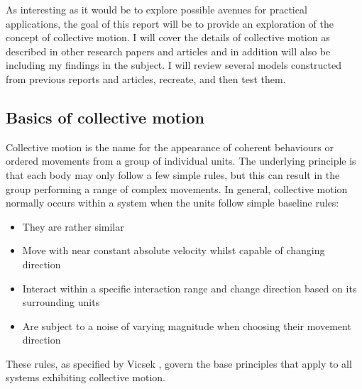 \documentclass[%
11pt,
amsmath, amssymb,
aps,
pra
]{revtex4-2}
\begin{document}
As interesting as it would be to explore possible avenues for practical applications, the goal of this report will be
to provide an exploration of the concept of collective motion.
 I will cover the details of collective motion
as described in other research papers and articles and in addition will also be including my findings in the subject.
I will review several models constructed from previous reports and articles, recreate, and then test them. 

\subsection{Basics of collective motion}

Collective motion is the name for the appearance of coherent behaviours or ordered movements from a group of individual units. 
The underlying principle is that each body may only follow a few simple rules, but this can result in the group performing
a range of complex movements. In general, collective motion normally occurs within a system when the units follow 
simple baseline rules: 
\begin{itemize}
    \item They are rather similar
    \item Move with near constant absolute velocity whilst capable of changing direction
    \item Interact within a specific interaction range and change direction based on its surrounding units
    \item Are subject to a noise of varying magnitude when choosing their movement direction
\end{itemize}
These rules, as specified by Vicsek \cite{vicsek2012collective}, govern the base principles that apply to all 
systems exhibiting collective motion. 
\end{document}

